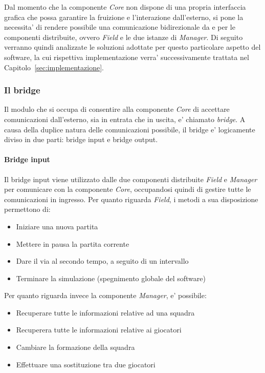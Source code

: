 Dal momento che la componente \textit{Core} non dispone di una propria interfaccia grafica che possa garantire la fruizione e l'interazione dall'esterno, si pone la necessita' di rendere possibile una comunicazione bidirezionale da e per le componenti distribuite, ovvero \textit{Field} e le due istanze di \textit{Manager}. Di seguito verranno quindi analizzate le soluzioni adottate per questo particolare aspetto del software, la cui rispettiva implementazione verra' successivamente trattata nel Capitolo~\ref{sec:implementazione}.

\subsubsection{Il bridge}
\label{sec:analisi_distribuzione_bridge}

Il modulo che si occupa di consentire alla componente \textit{Core} di accettare comunicazioni dall'esterno, sia in entrata che in uscita, e' chiamato \textit{bridge}. A causa della duplice natura delle comunicazioni possibile, il bridge e' logicamente diviso in due parti: bridge input e bridge output.

\paragraph{Bridge input}\label{sec:analisi_distribuzione_bridge_input} Il bridge input viene utilizzato dalle due componenti distribuite \textit{Field} e \textit{Manager} per comunicare con la componente \textit{Core}, occupandosi quindi di gestire tutte le comunicazioni in ingresso. Per quanto riguarda \textit{Field}, i metodi a sua disposizione permettono di:

\begin{itemize}
	\item Iniziare una nuova partita
	\item Mettere in pausa la partita corrente
	\item Dare il via al secondo tempo, a seguito di un intervallo
	\item Terminare la simulazione (spegnimento globale del software)
\end{itemize}

\noindent Per quanto riguarda invece la componente \textit{Manager}, e' possibile:

\begin{itemize}
	\item Recuperare tutte le informazioni relative ad una squadra
	\item Recuperera tutte le informazioni relative ai giocatori
	\item Cambiare la formazione della squadra
	\item Effettuare una sostituzione tra due giocatori
\end{itemize}

